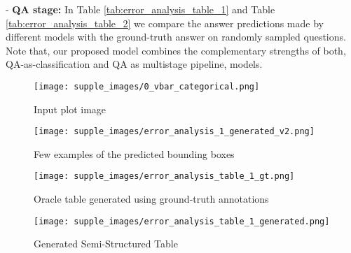 \documentclass[10pt,twocolumn,letterpaper]{article}
\begin{document}
- \textbf{QA stage:} In Table \ref{tab:error_analysis_table_1} and Table \ref{tab:error_analysis_table_2} we compare the answer predictions made by different models with the ground-truth answer on randomly sampled questions. Note that, our proposed model combines the complementary strengths of both, QA-as-classification and QA as multistage pipeline, models.

\begin{figure*}
\centering
\begin{subfigure}{.45\textwidth}
\centering
\texttt{[image: supple\_images/0\_vbar\_categorical.png]}
\caption{Input plot image}
\end{subfigure}
\hspace{0.5cm}
\begin{subfigure}{.45\textwidth}
\centering
\texttt{[image: supple\_images/error\_analysis\_1\_generated\_v2.png]}
\caption{Few examples of the predicted bounding boxes}
\end{subfigure}
\caption{}
\label{fig:error_analysis_ved_1}
\end{figure*}

\begin{figure*}
\centering
\begin{subfigure}{.45\textwidth}
\centering
\texttt{[image: supple\_images/error\_analysis\_table\_1\_gt.png]}
\caption{Oracle table generated using ground-truth annotations}
\end{subfigure}
\hspace{0.5cm}
\begin{subfigure}{.45\textwidth}
\centering
\texttt{[image: supple\_images/error\_analysis\_table\_1\_generated.png]}
\caption{Generated Semi-Structured Table}
\end{subfigure}
\caption{}
\label{fig:error_analysis_sie_1}
\end{figure*}
\end{document}
